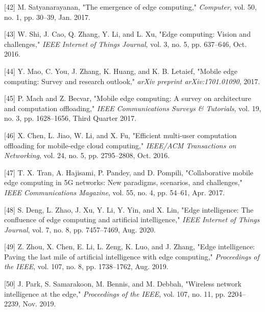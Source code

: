 \documentclass[conference]{IEEEtran}
\begin{document}
[42] M. Satyanarayanan, "The emergence of edge computing," \textit{Computer}, vol. 50, no. 1, pp. 30--39, Jan. 2017.

[43] W. Shi, J. Cao, Q. Zhang, Y. Li, and L. Xu, "Edge computing: Vision and challenges," \textit{IEEE Internet of Things Journal}, vol. 3, no. 5, pp. 637--646, Oct. 2016.

[44] Y. Mao, C. You, J. Zhang, K. Huang, and K. B. Letaief, "Mobile edge computing: Survey and research outlook," \textit{arXiv preprint arXiv:1701.01090}, 2017.

[45] P. Mach and Z. Becvar, "Mobile edge computing: A survey on architecture and computation offloading," \textit{IEEE Communications Surveys \& Tutorials}, vol. 19, no. 3, pp. 1628--1656, Third Quarter 2017.

[46] X. Chen, L. Jiao, W. Li, and X. Fu, "Efficient multi-user computation offloading for mobile-edge cloud computing," \textit{IEEE/ACM Transactions on Networking}, vol. 24, no. 5, pp. 2795--2808, Oct. 2016.

[47] T. X. Tran, A. Hajisami, P. Pandey, and D. Pompili, "Collaborative mobile edge computing in 5G networks: New paradigms, scenarios, and challenges," \textit{IEEE Communications Magazine}, vol. 55, no. 4, pp. 54--61, Apr. 2017.

[48] S. Deng, L. Zhao, J. Xu, Y. Li, Y. Yin, and X. Lin, "Edge intelligence: The confluence of edge computing and artificial intelligence," \textit{IEEE Internet of Things Journal}, vol. 7, no. 8, pp. 7457--7469, Aug. 2020.

[49] Z. Zhou, X. Chen, E. Li, L. Zeng, K. Luo, and J. Zhang, "Edge intelligence: Paving the last mile of artificial intelligence with edge computing," \textit{Proceedings of the IEEE}, vol. 107, no. 8, pp. 1738--1762, Aug. 2019.

[50] J. Park, S. Samarakoon, M. Bennis, and M. Debbah, "Wireless network intelligence at the edge," \textit{Proceedings of the IEEE}, vol. 107, no. 11, pp. 2204--2239, Nov. 2019.
\end{document}
